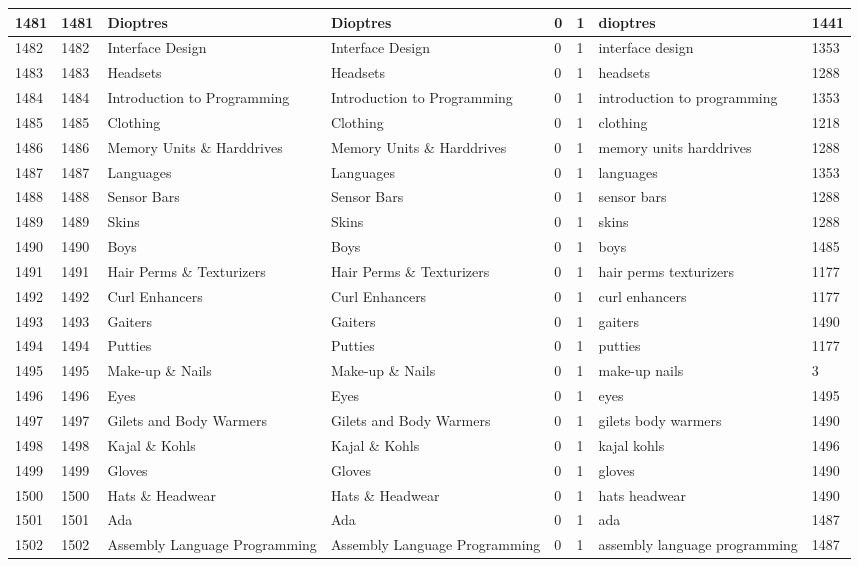 \begin{longtable}{|l|l|l|l|l|l|l|l|}
1481 & 1481 & Dioptres & Dioptres & 0 & 1 & dioptres & 1441 \\ \hline 
1482 & 1482 & Interface Design & Interface Design & 0 & 1 & interface design & 1353 \\ \hline 
1483 & 1483 & Headsets & Headsets & 0 & 1 & headsets & 1288 \\ \hline 
1484 & 1484 & Introduction to Programming & Introduction to Programming & 0 & 1 & introduction to programming & 1353 \\ \hline 
1485 & 1485 & Clothing & Clothing & 0 & 1 & clothing & 1218 \\ \hline 
1486 & 1486 & Memory Units \& Harddrives & Memory Units \& Harddrives & 0 & 1 & memory units harddrives & 1288 \\ \hline 
1487 & 1487 & Languages & Languages & 0 & 1 & languages & 1353 \\ \hline 
1488 & 1488 & Sensor Bars & Sensor Bars & 0 & 1 & sensor bars & 1288 \\ \hline 
1489 & 1489 & Skins & Skins & 0 & 1 & skins & 1288 \\ \hline 
1490 & 1490 & Boys & Boys & 0 & 1 & boys & 1485 \\ \hline 
1491 & 1491 & Hair Perms \& Texturizers & Hair Perms \& Texturizers & 0 & 1 & hair perms texturizers & 1177 \\ \hline 
1492 & 1492 & Curl Enhancers & Curl Enhancers & 0 & 1 & curl enhancers & 1177 \\ \hline 
1493 & 1493 & Gaiters & Gaiters & 0 & 1 & gaiters & 1490 \\ \hline 
1494 & 1494 & Putties & Putties & 0 & 1 & putties & 1177 \\ \hline 
1495 & 1495 & Make-up \& Nails & Make-up \& Nails & 0 & 1 & make-up nails & 3 \\ \hline 
1496 & 1496 & Eyes & Eyes & 0 & 1 & eyes & 1495 \\ \hline 
1497 & 1497 & Gilets and Body Warmers & Gilets and Body Warmers & 0 & 1 & gilets body warmers & 1490 \\ \hline 
1498 & 1498 & Kajal \& Kohls & Kajal \& Kohls & 0 & 1 & kajal kohls & 1496 \\ \hline 
1499 & 1499 & Gloves & Gloves & 0 & 1 & gloves & 1490 \\ \hline 
1500 & 1500 & Hats \& Headwear & Hats \& Headwear & 0 & 1 & hats headwear & 1490 \\ \hline 
1501 & 1501 & Ada & Ada & 0 & 1 & ada & 1487 \\ \hline 
1502 & 1502 & Assembly Language Programming & Assembly Language Programming & 0 & 1 & assembly language programming & 1487 \\ \hline 

\end{longtable}
